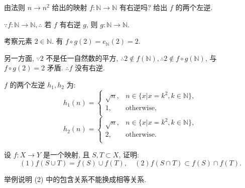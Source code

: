 \documentclass[color=black,device=normal,lang=cn,mode=geye]{elegantnote}
\begin{document}
\begin{exercise}%
    由法则 $n\to n^2$ 给出的映射 $f:\mathbb{N}\to\mathbb{N}$ 有右逆吗? 给出 $f$ 的两个左逆.
\end{exercise}
\begin{solution}
    $\because f:\mathbb{N}\to\mathbb{N},\therefore$ 若 $f$ 有右逆 $g$, 则 $g:\mathbb{N}\to\mathbb{N}$.

    考察元素 $2\in\mathbb{N}$. 有 $f\circ g(2)=e_{\mathbb{N}}(2)=2$.

    另一方面, $\because 2$ 不是任一自然数的平方, $\therefore2\notin f(\mathbb{N}),\therefore2\notin f\circ g(\mathbb{N})$, 与 $f\circ g(2)=2$ 矛盾. $\therefore f$ 没有右逆.

    $f$ 的两个左逆 $h_1,h_2$ 为:
    \[h_1(n)=\begin{cases}
        \sqrt{n}, & n\in\{x|x=k^2,k\in\mathbb{N}\}, \\
        1, & \text{otherwise}, \\
    \end{cases}\]
    \[h_2(n)=\begin{cases}
        \sqrt{n}, & n\in\{x|x=k^2,k\in\mathbb{N}\}, \\
        2, & \text{otherwise}. \\
    \end{cases}\]
\end{solution}
\begin{exercise}%
    设 $f:X\to Y$ 是一个映射, 且 $S,T\subset X$, 证明:
    \[(1)f(S\cup T)=f(S)\cup f(T),\quad(2)f(S\cap T)\subset f(S)\cap f(T).\]

    举例说明 (2) 中的包含关系不能换成相等关系.
\end{exercise}
\end{document}
